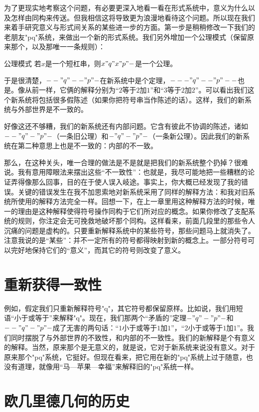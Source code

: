 为了更现实地考察这个问题，有必要更深入地看一看在形式系统中，意义为什么以及怎样由同构来传送。但我相信这将导致更为浪漫地看待这个问题。所以现在我们来着手研究意义与形式间关系的某些进一步的方面。第一步是稍稍修改一下我们的老朋友"pq"系统，来做出一个新的形式系统。我们另外增加一个公理模式（保留原来那个，以及那唯一一条规则）：
\begin{thm}{公理模式}
若$x$是一个短杠串，则$x"q"x"p"-$是一个公理。
\end{thm}
于是很清楚，$--"q"--"p"-$在新系统中是个定理，$---"q"--"p"--$也是。像从前一样，它俩的解释分别为“$2$等于$2$加$1$”和“$3$等于$2$加$2$”。可以看出我们这个新系统将包括很多假陈述（如果你把符号串当作陈述的话）。这样，我们的新系统与外部世界是不一致的。

好像这还不够糟，我们的新系统还有内部问题。它含有彼此不协调的陈述，诸如$--"q"-"p"-$（一条旧公理）和$-"q"-"p"-$（一条新公理）。因此我们的新系统在第二种意思上也是不一致的：内部的不一致。

那么，在这种关头，唯一合理的做法是不是就是把我们的新系统整个扔掉？很难说。我有意用障眼法来摆出这些“不一致性”：也就是，我尽可能地把一些糟糕的论证弄得像那么回事，目的在于使人误入岐途。事实上，你大概已经发现了我的错误。关键的错误发生在我不加思索地对新系统采用了同样的解释方法：和我对旧系统所使用的解释方法完全一样。回想一下，在上一章里用这种解释方法的时候，唯一的理由是这种解释使得符号操作同构于它们所对应的概念。如果你修改了支配系统的规则，你注定会无可挽救地破坏那个同构。这样看来，前面几段里的那些令人沉痛的问题是虚构的。只要重新解释系统中的某些符号，那些问题马上就消失了。注意我说的是“某些”：并不一定所有的符号都得映射到新的概念上。一部分符号可以完好地保持它们的“意义”，而其它的符号则改变了意义。

\section{重新获得一致性}

例如，假定我们只重新解释符号"q"，其它符号都保留原样。比如说，我们用短语“小于或等于”来解释"q"。现在，我们那两个“矛盾的”定理$-"q"-"p"-$和$--"q"-"p"-$成了无害的两句话：“$1$小于或等于$1$加$1$”，“$2$小于或等于$1$加$1$”。我们同时摆脱了与外部世界的不致性，和内部的不一致性。我们的新解释是个有意义的解释。当然，原来那个是无意义的，就是说，它对于新系统来说没有意义。对于原来那个"pq"系统，它挺好。但现在看来，把它用在新的"pq"系统上过于随意，也没有道理，就像用“马—苹果—幸福”来解释旧的"pq"系统一样。

\section{欧几里德几何的历史}

